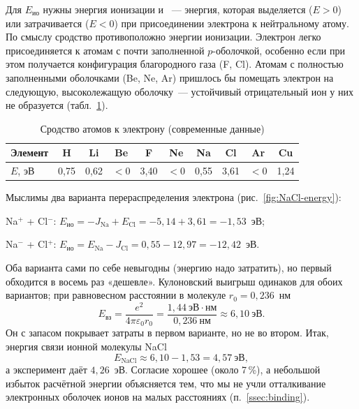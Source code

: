 Для $E_\text{ио}$ нужны энергия ионизации и ~—
энергия, которая выделяется ($E>0$) или затрачивается ($E<0$) при
присоединении электрона к нейтральному атому. По смыслу сродство
противоположно энергии ионизации. Электрон легко присоединяется к атомам
с почти заполненной $p$-оболочкой, особенно если при этом получается
конфигурация благородного газа (F, Cl). Атомам с полностью заполненными
оболочками (Be, Ne, Ar) пришлось бы помещать электрон на следующую,
высоколежащую оболочку~— устойчивый отрицательный ион у них не
образуется (табл.~\ref{tab:affinity}).

\begin{table}[ht]
\centering
\caption{Сродство атомов к электрону (современные данные)}
\label{tab:affinity}
\small
\begin{tabular}{@{}lccccccccc@{}}
\toprule
Элемент & H & Li & Be & F & Ne & Na & Cl & Ar & Cu \\
\midrule
$E$, эВ & 0,75 & 0,62 & $<0$ & 3,40 & $<0$ & 0,55 & 3,61 & $<0$ & 1,24 \\
\bottomrule
\end{tabular}
\end{table}

Мыслимы два варианта перераспределения электрона
(рис.~\ref{fig:NaCl-energy}):
\begin{shagi}
\item Na$^+$ + Cl$^-$: $E_\text{ио}=-J_\text{Na}+E_\text{Cl}=-5{,}14+3{,}61=-1{,}53$~эВ;
\item Na$^-$ + Cl$^+$: $E_\text{ио}=E_\text{Na}-J_\text{Cl}=0{,}55-12{,}97=-12{,}42$~эВ.
\end{shagi}
Оба варианта сами по себе невыгодны (энергию надо затратить), но первый
обходится в восемь раз «дешевле». Кулоновский выигрыш одинаков для обоих
вариантов; при равновесном расстоянии в молекуле $r_0=0{,}236$~нм
\[
E_\text{вз}=\frac{e^2}{4\pi\varepsilon_0r_0}
=\frac{1{,}44~\text{эВ}\cdot\text{нм}}{0{,}236~\text{нм}}\approx6{,}10~\text{эВ}.
\]
Он с запасом покрывает затраты в первом варианте, но не во втором. Итак,
энергия связи ионной молекулы NaCl
\[
E_\text{NaCl}\approx6{,}10-1{,}53=4{,}57~\text{эВ},
\]
а эксперимент даёт $4{,}26$~эВ. Согласие хорошее (около
7\,\%), а небольшой избыток расчётной энергии объясняется тем, что мы
не учли отталкивание электронных оболочек ионов на малых расстояниях
(п.~\ref{ssec:binding}).


